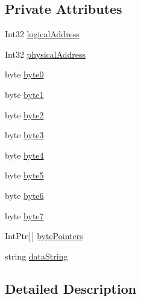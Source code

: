 \subsection*{Private Attributes}
\begin{DoxyCompactItemize}
\item 
Int32 \hyperlink{class_c_p_u___o_s___simulator_1_1_memory_1_1_memory_segment_a27b4e22dcb1789a77734671f6d90e62e}{logical\+Address}
\item 
Int32 \hyperlink{class_c_p_u___o_s___simulator_1_1_memory_1_1_memory_segment_a0477db48e8386456f2bd08632fd4508b}{physical\+Address}
\item 
byte \hyperlink{class_c_p_u___o_s___simulator_1_1_memory_1_1_memory_segment_a97b8721f717e2fd03673d9dd96882ef8}{byte0}
\item 
byte \hyperlink{class_c_p_u___o_s___simulator_1_1_memory_1_1_memory_segment_aa64e7a88f9cdf5dbb5b0c846cc570a77}{byte1}
\item 
byte \hyperlink{class_c_p_u___o_s___simulator_1_1_memory_1_1_memory_segment_a4f6ad3b2d132bfc1c4bd16d8fcca8d56}{byte2}
\item 
byte \hyperlink{class_c_p_u___o_s___simulator_1_1_memory_1_1_memory_segment_a48874b9f9dede6546e365d3bc1e28926}{byte3}
\item 
byte \hyperlink{class_c_p_u___o_s___simulator_1_1_memory_1_1_memory_segment_a1979475ad1134e07235880ccbd6b82f7}{byte4}
\item 
byte \hyperlink{class_c_p_u___o_s___simulator_1_1_memory_1_1_memory_segment_a6d35dbdcd3428e9a1869fda265341123}{byte5}
\item 
byte \hyperlink{class_c_p_u___o_s___simulator_1_1_memory_1_1_memory_segment_a242f25c3861a3c0d1d51484203ea8603}{byte6}
\item 
byte \hyperlink{class_c_p_u___o_s___simulator_1_1_memory_1_1_memory_segment_af4a4ab7c802e0a5b5f3684c0cfac5f80}{byte7}
\item 
Int\+Ptr\mbox{[}$\,$\mbox{]} \hyperlink{class_c_p_u___o_s___simulator_1_1_memory_1_1_memory_segment_a8ac7f7e71e129c194aa2b33b4929b25e}{byte\+Pointers}
\item 
string \hyperlink{class_c_p_u___o_s___simulator_1_1_memory_1_1_memory_segment_a624f2466fc6b73498e222f43f329adbb}{data\+String}
\end{DoxyCompactItemize}


\subsection{Detailed Description}



